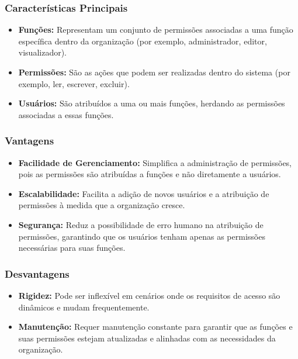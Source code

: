 \documentclass{scrartcl}
\begin{document}
\subsubsection{Características Principais}
\label{sec:org1bdd82c}
\begin{itemize}
\item \textbf{\textbf{Funções:}} Representam um conjunto de permissões associadas a uma função
específica dentro da organização (por exemplo, administrador, editor,
visualizador).
\item \textbf{\textbf{Permissões:}} São as ações que podem ser realizadas dentro do sistema (por
exemplo, ler, escrever, excluir).
\item \textbf{\textbf{Usuários:}} São atribuídos a uma ou mais funções, herdando as permissões
associadas a essas funções.
\end{itemize}

\subsubsection{Vantagens}
\label{sec:org226f027}
\begin{itemize}
\item \textbf{\textbf{Facilidade de Gerenciamento:}} Simplifica a administração de permissões,
pois as permissões são atribuídas a funções e não diretamente a usuários.
\item \textbf{\textbf{Escalabilidade:}} Facilita a adição de novos usuários e a atribuição de
permissões à medida que a organização cresce.
\item \textbf{\textbf{Segurança:}} Reduz a possibilidade de erro humano na atribuição de
permissões, garantindo que os usuários tenham apenas as permissões necessárias
para suas funções.
\end{itemize}

\subsubsection{Desvantagens}
\label{sec:org81b5147}
\begin{itemize}
\item \textbf{\textbf{Rigidez:}} Pode ser inflexível em cenários onde os requisitos de acesso são
dinâmicos e mudam frequentemente.
\item \textbf{\textbf{Manutenção:}} Requer manutenção constante para garantir que as funções e
suas permissões estejam atualizadas e alinhadas com as necessidades da
organização.
\end{itemize}
\end{document}
